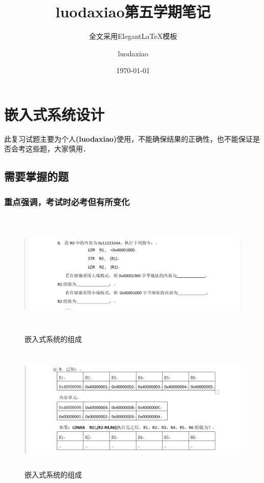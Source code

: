 \documentclass[cn,11pt]{elegantbook}
\title{luodaxiao第五学期笔记}
\subtitle{全文采用Elegant\LaTeX{}模板}
\author{luodaxiao}
\institute{luodaxiao}
\date{\today}
\begin{document}
\maketitle
\tableofcontents


\mainmatter
\hypersetup{pageanchor=true}

\chapter{嵌入式系统设计}

\large{此复习试题主要为个人\textbf{(luodaxiao)}使用，不能确保结果的正确性，也不能保证是否会考这些题，大家慎用．}
\section{需要掌握的题}

\subsection{重点强调，考试时必考但有所变化}
	\begin{figure}[htbp]
	\centering
	\includegraphics[height=6.0cm,width=15cm]{image/8.png}%
	\caption{嵌入式系统的组成}
\end{figure}

	\begin{figure}[htbp]
	\centering
	\includegraphics[height=6.0cm,width=15cm]{image/9.png}%
	\caption{嵌入式系统的组成}
\end{figure}
\end{document}
